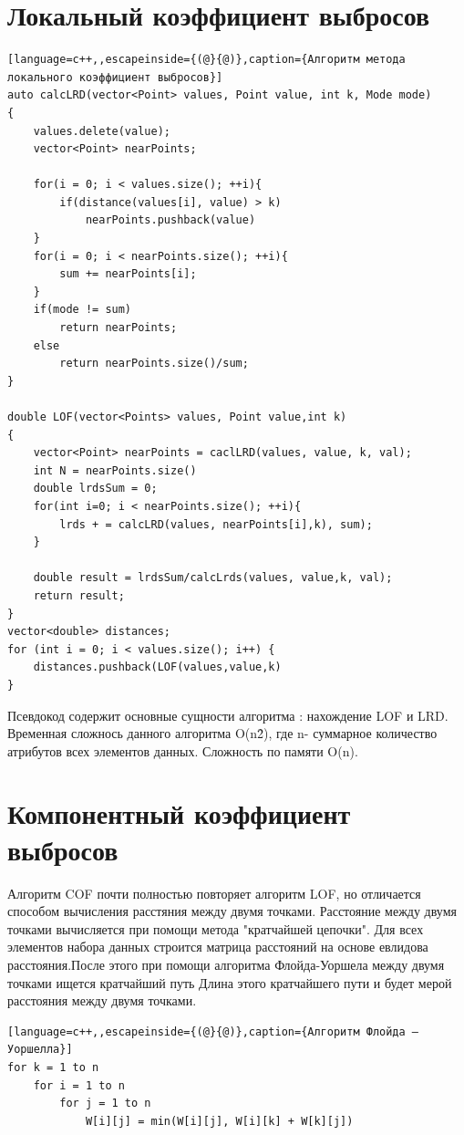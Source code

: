 \section{Локальный коэффициент выбросов}

\begin{lstlisting}[language=c++,,escapeinside={(@}{@)},caption={Алгоритм метода локального коэффициент выбросов}] 
auto calcLRD(vector<Point> values, Point value, int k, Mode mode)
{
	values.delete(value);
	vector<Point> nearPoints;
	
	for(i = 0; i < values.size(); ++i){
		if(distance(values[i], value) > k)
			nearPoints.pushback(value)
	}
	for(i = 0; i < nearPoints.size(); ++i){
		sum += nearPoints[i];
	}
	if(mode != sum)
		return nearPoints;
	else 
		return nearPoints.size()/sum;
}

double LOF(vector<Points> values, Point value,int k)
{
    vector<Point> nearPoints = caclLRD(values, value, k, val);
    int N = nearPoints.size()
    double lrdsSum = 0;
	for(int i=0; i < nearPoints.size(); ++i){
		lrds + = calcLRD(values, nearPoints[i],k), sum);
	}
	
	double result = lrdsSum/calcLrds(values, value,k, val);
	return result;		
}
vector<double> distances;
for (int i = 0; i < values.size(); i++) {
	distances.pushback(LOF(values,value,k)
}
\end{lstlisting}
Псевдокод содержит основные сущности алгоритма : нахождение LOF и LRD. Временная сложнось данного алгоритма O(n\^2), где n- суммарное количество атрибутов всех элементов данных. Сложность по памяти O(n).
\section{Компонентный коэффициент выбросов}
Алгоритм COF почти полностью повторяет алгоритм LOF, но отличается способом вычисления расстяния между двумя точками. Расстояние между двумя точками вычисляется при помощи метода "кратчайшей цепочки". Для всех  элементов набора данных строится матрица расстояний на основе евлидова расстояния.После этого при помощи алгоритма Флойда-Уоршела между двумя точками ищется кратчайший путь Длина этого кратчайшего пути и будет мерой расстояния между двумя точками. 

\begin{lstlisting}[language=c++,,escapeinside={(@}{@)},caption={Алгоритм Флойда — Уоршелла}] 
for k = 1 to n
	for i = 1 to n
		for j = 1 to n
			W[i][j] = min(W[i][j], W[i][k] + W[k][j])
\end{lstlisting}
